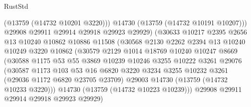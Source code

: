 \begin{lexlean}{RustStd}
\begin{coremodule}
                              (@13759 (@14732 @10201 @3220)))
                            @14730
                            (@13759 (@14732 @10191 @10207)))
                          @29908
                          @29911
                          @29914
                          @29918
                          @29923
                          @29929)
                        (@30633
                          @10217
                          @2395
                          @2656
                          @13
                          @10240
                          @10862
                          @10886
                          @11508
                          (@30568
                            @2130
                            @2262
                            @2394
                            @13
                            @10240
                            @10249
                            @3220
                            @10862
                            (@30579
                              @2129
                              @1014
                              @18769
                              @10240
                              @10247
                              @8669
                              (@30588
                                @1175
                                @53
                                @55
                                @3869
                                @10239
                                @10246
                                @3255
                                @10222
                                @3261
                                @29076
                                (@30587
                                  @1173
                                  @103
                                  @53
                                  @16
                                  @6820
                                  @3220
                                  @3234
                                  @3255
                                  @10232
                                  @3261
                                  (@29036 @1172 @6820 @23705 @23709)
                                  @29003
                                  @14730
                                  (@13759 (@14732 @10233 @3220)))
                                @14730
                                (@13759 (@14732 @10223 @10239)))
                              @29908
                              @29911
                              @29914
                              @29918
                              @29923
                              @29929)

\end{coremodule}
\end{lexlean}
